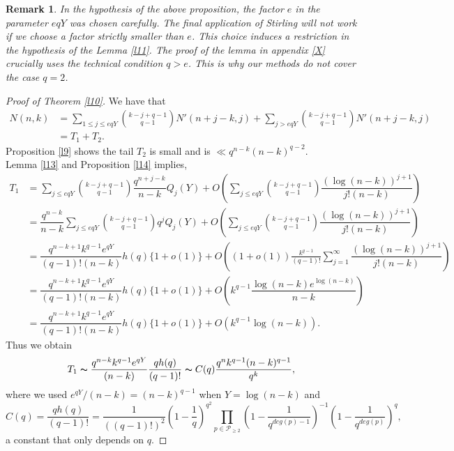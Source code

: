 \documentclass[12pt]{amsart}
\numberwithin{equation}{section}
\newtheorem{remark}[theorem]{Remark}
\theoremstyle{remark}
\theoremstyle{remark}
\theoremstyle{definition}
\begin{document}
\begin{remark}\label{Y}
In the hypothesis of the above proposition, the factor $e$ in the parameter $eqY$ was chosen carefully. The final application of Stirling will not work if we choose a factor strictly smaller than $e$. This choice induces a restriction in the hypothesis of the Lemma \ref{l11}. The proof of the lemma in appendix \ref{X} crucially uses the technical condition $q>e$. This is why our methods do not cover the case $q=2$.
\end{remark}
\begin{proof}[Proof of Theorem \ref{l10}]
\label{Proof of Theorem 3.1}
We have that
\begin{align}
\nonumber
N(n,k) &= \displaystyle\sum_{1\leqslant j\leqslant eq Y} \binom{k-j+q-1}{q-1}N'(n+j-k,j)+\displaystyle\sum_{j> eq Y} \binom{k-j+q-1}{q-1}N'(n+j-k,j)\\
\nonumber
&=T_1+T_2.
\end{align}
Proposition \ref{l9} shows the tail $T_2$ is small and is $\ll q^{n-k}(n-k)^{q-2}.$\\
Lemma \ref{l13} and Proposition \ref{l14} implies,
\begin{align}
\nonumber
T_1 &=\displaystyle\sum\limits_{j\leqslant eqY}\binom{k-j+q-1}{q-1}\dfrac{q^{n+j-k}}{n-k}Q_j(Y)+O\left(\displaystyle\sum\limits_{j\leqslant eqY}\binom{k-j+q-1}{q-1}\dfrac{(\log (n-k))^{j+1}}{j!(n-k)} \right)\\
\nonumber
&=\dfrac{q^{n-k}}{n-k}\displaystyle\sum\limits_{j\leqslant eqY}\binom{k-j+q-1}{q-1}q^jQ_j(Y)+O\left(\displaystyle\sum\limits_{j\leqslant eqY}\binom{k-j+q-1}{q-1}\dfrac{(\log (n-k))^{j+1}}{j!(n-k)} \right)\\
\nonumber
&= \dfrac{q^{n-k+1}k^{q-1}e^{qY}}{(q-1)!(n-k)}h(q)\Big\{1+o(1)\Big \}+O\left((1+o(1))\frac{k^{q-1}}{(q-1)!}\displaystyle\sum\limits_{j=1}^{\infty}\dfrac{(\log (n-k))^{j+1}}{j!(n-k)} \right)\\
\nonumber
&= \dfrac{q^{n-k+1}k^{q-1}e^{qY}}{(q-1)!(n-k)}h(q)\Big\{1+o(1)\Big \}+O\left(k^{q-1}\dfrac{\log(n-k)e^{\log(n-k)}}{n-k} \right)\\
\nonumber
&= \dfrac{q^{n-k+1}k^{q-1}e^{qY}}{(q-1)!(n-k)}h(q)\Big\{1+o(1)\Big \}+O\left(k^{q-1}\log(n-k)\right).
\end{align}
Thus we obtain
$$T_1\thicksim \dfrac{q^{n-k}k^{q-1}e^{qY}}{(n-k)}\dfrac{qh(q)}{(q-1)!}\thicksim C(q)\dfrac{q^nk^{q-1}(n-k)^{q-1}}{q^k},$$
where we used $e^{qY}/(n-k)=(n-k)^{q-1}$ when $Y=\log(n-k)$ and
\[C(q)=\dfrac{qh(q)}{(q-1)!}=\dfrac{1}{\left((q-1)!\right)^2}\left( 1-\dfrac{1}{q}\right)^{q^2}\displaystyle\prod\limits_{p\in\mathcal{P}_{\geqslant 2}}\left(1-\frac{1}{q^{deg(p)-1}}\right)^{-1}\left( 1-\frac{1}{q^{deg(p)}}\right)^q,\] a constant that only depends on $q$.
\end{proof}
\appendix
\end{document}
